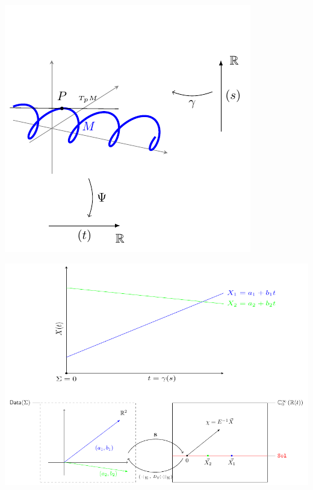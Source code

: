 \documentclass{article}
\begin{document}
	\includegraphics[width=\textwidth]{../Pictures/Jacobi1D_GeometricPicture0}
				
	\includegraphics[width=\textwidth]{../Pictures/Jacobi1D_GeometricPicturePanoramica}	
  				
\end{document}
